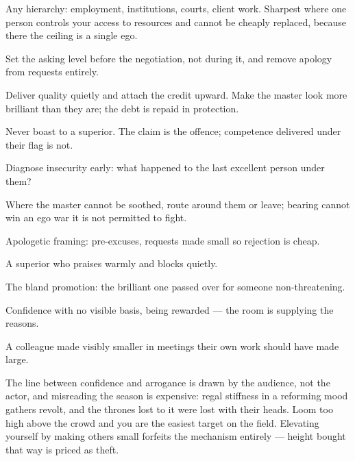 \begin{conditions}
Any hierarchy: employment, institutions, courts, client work. Sharpest where one person controls your access to resources and cannot be cheaply replaced, because there the ceiling is a single ego.
\end{conditions}

\begin{application}
  \item Set the asking level before the negotiation, not during it, and remove apology from requests entirely.
  \item Deliver quality quietly and attach the credit upward. Make the master look more brilliant than they are; the debt is repaid in protection.
  \item Never boast to a superior. The claim is the offence; competence delivered under their flag is not.
  \item Diagnose insecurity early: what happened to the last excellent person under them?
  \item Where the master cannot be soothed, route around them or leave; bearing cannot win an ego war it is not permitted to fight.
\end{application}

\begin{feedback}
  \item Apologetic framing: pre-excuses, requests made small so rejection is cheap.
  \item A superior who praises warmly and blocks quietly.
  \item The bland promotion: the brilliant one passed over for someone non-threatening.
  \item Confidence with no visible basis, being rewarded --- the room is supplying the reasons.
  \item A colleague made visibly smaller in meetings their own work should have made large.
\end{feedback}

\begin{failure}
The line between confidence and arrogance is drawn by the audience, not the actor, and misreading the season is expensive: regal stiffness in a reforming mood gathers revolt, and the thrones lost to it were lost with their heads. Loom too high above the crowd and you are the easiest target on the field. Elevating yourself by making others small forfeits the mechanism entirely --- height bought that way is priced as theft.
\end{failure}

